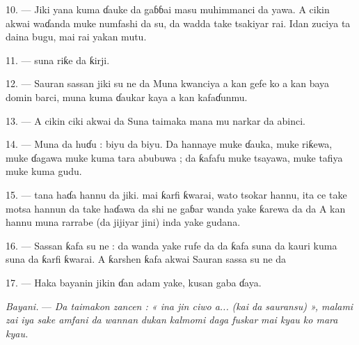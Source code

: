 10. --- Jiki yana kuma ɗauke da gaɓɓai masu muhimmanci da yawa. A
cikin  akwai  waɗanda muke numfashi da su,
da  wadda take tsakiyar rai. Idan zuciya ta daina bugu,
mai rai yakan mutu.

11. ---  suna riƙe da ƙirji.

12. --- Sauran sassan jiki su ne  
 da  Muna kwanciya a kan gefe ko a kan
baya domin barci, muna kuma ɗaukar kaya a kan kafaɗunmu.

13. --- A cikin ciki akwai  da  Suna
taimaka mana mu narkar da abinci.

\VUsaut{4.4mm}
\VUsaut{3.0mm}

14. --- Muna da  huɗu :  biyu da
 biyu. Da hannaye muke ɗauka, muke riƙewa, muke ɗagawa
muke kuma tara abubuwa ; da ƙafafu muke tsayawa, muke tafiya muke kuma
gudu.

15. ---  tana haɗa hannu da jiki.  mai
ƙarfi ƙwarai, wato tsokar hannu, ita ce take motsa hannun da
 take haɗawa da 
 shi ne gaɓar  wanda yake
ƙarewa da  da  A kan hannu muna
rarrabe  (da jijiyar jini) inda  yake
gudana.

16. --- Sassan ƙafa su ne :   da
  wanda 
yake rufe da   da   ƙafa suna da kauri kuma suna da ƙarfi
ƙwarai. A ƙarshen ƙafa akwai  Sauran sassa su ne
 da 

17. --- Haka bayanin jikin ɗan adam yake, kusan gaba ɗaya.

\textit{Bayani.} --- \textit{Da taimakon zancen : « ina jin ciwo a...}
\textit{(kai da sauransu) », malami zai iya sake amfani da wannan}
\textit{dukan kalmomi daga fuskar}  \textit{mai
kyau ko mara kyau.}

\VUsaut{5.0mm}
\VUsaut{2.4mm}
\VUsaut{3.0mm}

